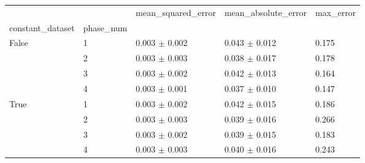 \begin{tabular}{lllll}
\toprule
 &  & mean_squared_error & mean_absolute_error & max_error \\
constant_dataset & phase_num &  &  &  \\
\midrule
\multirow[t]{4}{*}{False} & 1 & 0.003 $\pm$ 0.002 & 0.043 $\pm$ 0.012 & 0.175 \\
 & 2 & 0.003 $\pm$ 0.003 & 0.038 $\pm$ 0.017 & 0.178 \\
 & 3 & 0.003 $\pm$ 0.002 & 0.042 $\pm$ 0.013 & 0.164 \\
 & 4 & 0.003 $\pm$ 0.001 & 0.037 $\pm$ 0.010 & 0.147 \\
\cline{1-5}
\multirow[t]{4}{*}{True} & 1 & 0.003 $\pm$ 0.002 & 0.042 $\pm$ 0.015 & 0.186 \\
 & 2 & 0.003 $\pm$ 0.003 & 0.039 $\pm$ 0.016 & 0.266 \\
 & 3 & 0.003 $\pm$ 0.002 & 0.039 $\pm$ 0.015 & 0.183 \\
 & 4 & 0.003 $\pm$ 0.003 & 0.040 $\pm$ 0.016 & 0.243 \\
\cline{1-5}
\bottomrule
\end{tabular}
